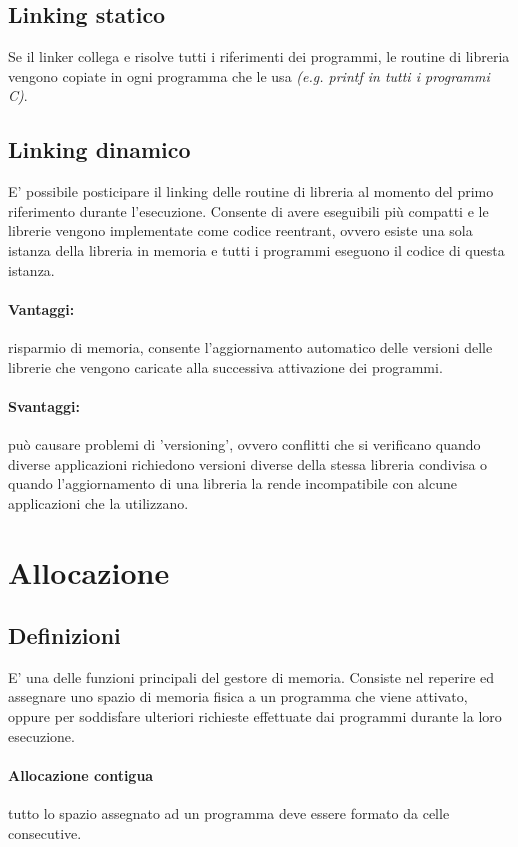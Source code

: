 \subsection{Linking statico}
Se il linker collega e risolve tutti i riferimenti dei programmi, le routine di libreria vengono copiate in ogni programma che le usa
\textit{(e.g. printf in tutti i programmi C)}.

\subsection{Linking dinamico}
E' possibile posticipare il linking delle routine di libreria al momento del primo riferimento durante l'esecuzione.
Consente di avere eseguibili più compatti e le librerie vengono implementate come codice reentrant, ovvero esiste una sola istanza della libreria in memoria e tutti i programmi eseguono il codice di questa istanza.

\paragraph{Vantaggi:} risparmio di memoria, consente l'aggiornamento automatico delle versioni delle librerie
che vengono caricate alla successiva attivazione dei programmi.

\paragraph{Svantaggi:} può causare problemi di 'versioning', ovvero conflitti che si verificano quando diverse applicazioni richiedono versioni diverse della stessa libreria condivisa o quando l'aggiornamento di una libreria la rende incompatibile con alcune applicazioni che la utilizzano.
\newpage
\section{Allocazione}
\subsection{Definizioni}
E' una delle funzioni principali del gestore di memoria.
Consiste nel reperire ed assegnare uno spazio di memoria fisica  a un programma che viene attivato, oppure per soddisfare ulteriori richieste effettuate dai programmi durante la loro esecuzione.

\paragraph{Allocazione contigua} tutto lo spazio assegnato ad un programma deve essere formato da celle consecutive.
